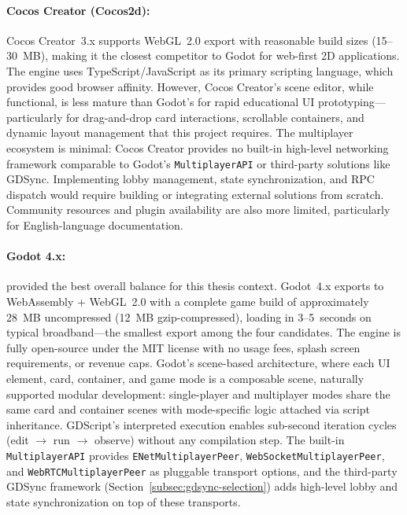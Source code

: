 \paragraph*{Cocos Creator (Cocos2d):}
Cocos Creator~3.x supports WebGL~2.0 export with reasonable build sizes (15--30~MB), making it the closest competitor to Godot for web-first 2D applications. The engine uses TypeScript/JavaScript as its primary scripting language, which provides good browser affinity. However, Cocos Creator's scene editor, while functional, is less mature than Godot's for rapid educational UI prototyping---particularly for drag-and-drop card interactions, scrollable containers, and dynamic layout management that this project requires. The multiplayer ecosystem is minimal: Cocos Creator provides no built-in high-level networking framework comparable to Godot's \texttt{Multiplayer\-API} or third-party solutions like GDSync. Implementing lobby management, state synchronization, and RPC dispatch would require building or integrating external solutions from scratch. Community resources and plugin availability are also more limited, particularly for English-language documentation.

\paragraph*{Godot 4.x:}
provided the best overall balance for this thesis context. Godot~4.x exports to WebAssembly + WebGL~2.0 with a complete game build of approximately 28~MB uncompressed (12~MB gzip-compressed), loading in 3--5~seconds on typical broadband---the smallest export among the four candidates. The engine is fully open-source under the MIT license with no usage fees, splash screen requirements, or revenue caps. Godot's scene-based architecture, where each UI element, card, container, and game mode is a composable scene, naturally supported modular development: single-player and multiplayer modes share the same card and container scenes with mode-specific logic attached via script inheritance. GDScript's interpreted execution enables sub-second iteration cycles (edit $\to$ run $\to$ observe) without any compilation step. The built-in \texttt{MultiplayerAPI} provides \texttt{ENetMultiplayerPeer}, \texttt{WebSocketMultiplayerPeer}, and \texttt{WebRTCMultiplayerPeer} as pluggable transport options, and the third-party GDSync framework (Section~\ref{subsec:gdsync-selection}) adds high-level lobby and state synchronization on top of these transports.

